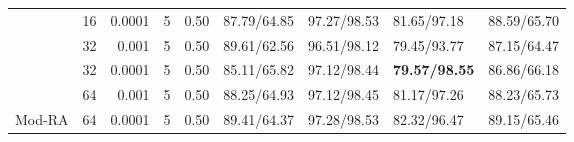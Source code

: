 \begin{table}
\begin{tabular}{l|rr|rr|llll}
                & 16    & 0.0001    & 5  & 0.50     & 87.79/64.85   & 97.27/98.53    & 81.65/97.18   & 88.59/65.70   \\
                & 32    & 0.001     & 5  & 0.50     & 89.61/62.56   & 96.51/98.12    & 79.45/93.77   & 87.15/64.47   \\
                & 32    & 0.0001    & 5  & 0.50     & 85.11/65.82   & 97.12/98.44    & \textbf{79.57/98.55}   & 86.86/66.18   \\
                & 64    & 0.001     & 5  & 0.50     & 88.25/64.93   & 97.12/98.45    & 81.17/97.26   & 88.23/65.73   \\
    Mod-RA & 64    & 0.0001    & 5  & 0.50     & 89.41/64.37   & 97.28/98.53    & 82.32/96.47   & 89.15/65.46   \\
    \bottomrule
    \end{tabular}
\end{table}
